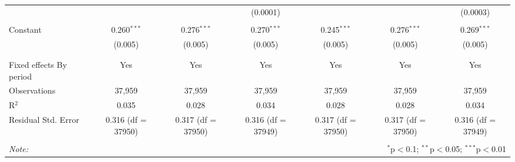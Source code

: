 \begin{table}[!htbp]
{\begin{tabular}{@{\extracolsep{5pt}}lcccccc}
    &  &  & (0.0001) &  &  & (0.0003) \\
    & & & & & & \\
   Constant & 0.260$^{***}$ & 0.276$^{***}$ & 0.270$^{***}$ & 0.245$^{***}$ & 0.276$^{***}$ & 0.269$^{***}$ \\
    & (0.005) & (0.005) & (0.005) & (0.005) & (0.005) & (0.005) \\
    & & & & & & \\
  \hline \\[-1.8ex]
  Fixed effects By period & Yes & Yes & Yes & Yes & Yes & Yes \\
  Observations & 37,959 & 37,959 & 37,959 & 37,959 & 37,959 & 37,959 \\
  R$^{2}$ & 0.035 & 0.028 & 0.034 & 0.028 & 0.028 & 0.034 \\
  Residual Std. Error & 0.316 (df = 37950) & 0.317 (df = 37950) & 0.316 (df = 37949) & 0.317 (df = 37950) & 0.317 (df = 37950) & 0.316 (df = 37949) \\
  \hline
  \hline \\[-1.8ex]
  \textit{Note:}  & \multicolumn{6}{r}{$^{*}$p$<$0.1; $^{**}$p$<$0.05; $^{***}$p$<$0.01} \\
  \end{tabular}

}

\end{table}

